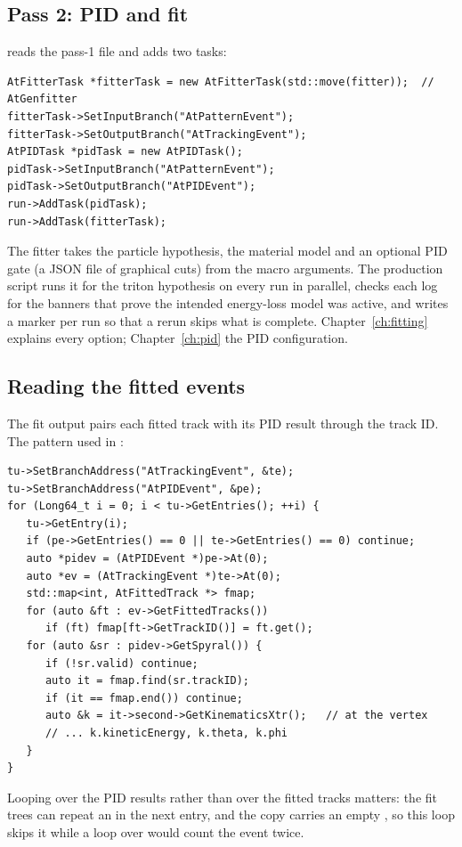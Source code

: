\subsection{Pass 2: PID and fit}

 reads the pass-1 file and adds two tasks:
\begin{verbatim}
AtFitterTask *fitterTask = new AtFitterTask(std::move(fitter));  // AtGenfitter
fitterTask->SetInputBranch("AtPatternEvent");
fitterTask->SetOutputBranch("AtTrackingEvent");
AtPIDTask *pidTask = new AtPIDTask();
pidTask->SetInputBranch("AtPatternEvent");
pidTask->SetOutputBranch("AtPIDEvent");
run->AddTask(pidTask);
run->AddTask(fitterTask);
\end{verbatim}
The fitter takes the particle hypothesis, the material model and an optional PID gate (a JSON file of graphical cuts)
from the macro arguments. The production script  runs it for the triton hypothesis
on every run in parallel, checks each log for the banners that prove the intended energy-loss model was active, and
writes a  marker per run so that a rerun skips what is complete. Chapter~\ref{ch:fitting} explains every
option; Chapter~\ref{ch:pid} the PID configuration.

\subsection{Reading the fitted events}

The fit output pairs each fitted track with its PID result through the track ID. The pattern used in
:
\begin{verbatim}
tu->SetBranchAddress("AtTrackingEvent", &te);
tu->SetBranchAddress("AtPIDEvent", &pe);
for (Long64_t i = 0; i < tu->GetEntries(); ++i) {
   tu->GetEntry(i);
   if (pe->GetEntries() == 0 || te->GetEntries() == 0) continue;
   auto *pidev = (AtPIDEvent *)pe->At(0);
   auto *ev = (AtTrackingEvent *)te->At(0);
   std::map<int, AtFittedTrack *> fmap;
   for (auto &ft : ev->GetFittedTracks())
      if (ft) fmap[ft->GetTrackID()] = ft.get();
   for (auto &sr : pidev->GetSpyral()) {
      if (!sr.valid) continue;
      auto it = fmap.find(sr.trackID);
      if (it == fmap.end()) continue;
      auto &k = it->second->GetKinematicsXtr();   // at the vertex
      // ... k.kineticEnergy, k.theta, k.phi
   }
}
\end{verbatim}
Looping over the PID results rather than over the fitted tracks matters: the fit trees can repeat an
 in the next entry, and the copy carries an empty , so this loop skips it while a
loop over  would count the event twice.

